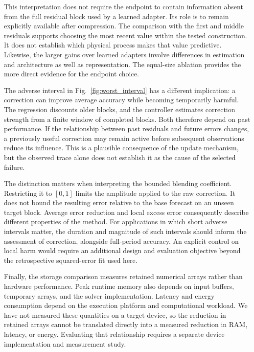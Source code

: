 This interpretation does not require the endpoint to contain information absent from the full residual block used by a learned adapter. Its role is to remain explicitly available after compression. The comparison with the first and middle residuals supports choosing the most recent value within the tested construction. It does not establish which physical process makes that value predictive. Likewise, the larger gains over learned adapters involve differences in estimation and architecture as well as representation. The equal-size ablation provides the more direct evidence for the endpoint choice.

The adverse interval in Fig.~\ref{fig:worst_interval} has a different implication: a correction can improve average accuracy while becoming temporarily harmful. The regression discounts older blocks, and the controller estimates correction strength from a finite window of completed blocks. Both therefore depend on past performance. If the relationship between past residuals and future errors changes, a previously useful correction may remain active before subsequent observations reduce its influence. This is a plausible consequence of the update mechanism, but the observed trace alone does not establish it as the cause of the selected failure.

The distinction matters when interpreting the bounded blending coefficient. Restricting it to $[0,1]$ limits the amplitude applied to the raw correction. It does not bound the resulting error relative to the base forecast on an unseen target block. Average error reduction and local excess error consequently describe different properties of the method. For applications in which short adverse intervals matter, the duration and magnitude of such intervals should inform the assessment of correction, alongside full-period accuracy. An explicit control on local harm would require an additional design and evaluation objective beyond the retrospective squared-error fit used here.

Finally, the storage comparison measures retained numerical arrays rather than hardware performance. Peak runtime memory also depends on input buffers, temporary arrays, and the solver implementation. Latency and energy consumption depend on the execution platform and computational workload. We have not measured these quantities on a target device, so the reduction in retained arrays cannot be translated directly into a measured reduction in RAM, latency, or energy. Evaluating that relationship requires a separate device implementation and measurement study.
